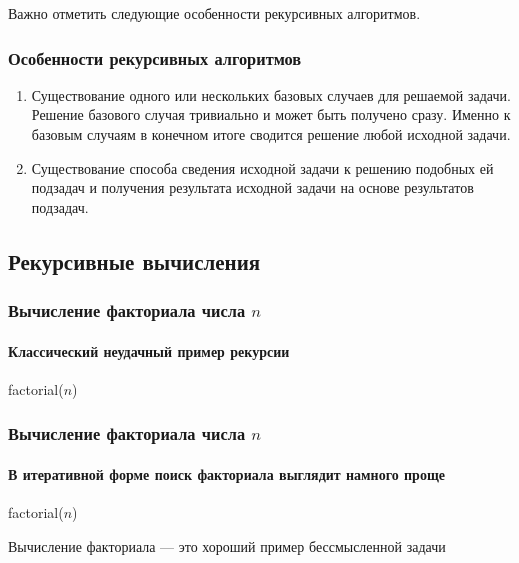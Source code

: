 Важно отметить следующие особенности рекурсивных алгоритмов.
\begin{frame}
    \frametitle{Особенности рекурсивных алгоритмов}
    \begin{enumerate}
        \item Существование одного или нескольких \alert{базовых} случаев для решаемой задачи. Решение базового случая тривиально и может быть получено сразу. Именно к базовым случаям в конечном итоге сводится решение любой исходной задачи.
        
        \item Существование \alert{способа сведения} исходной задачи к решению подобных ей подзадач и получения результата исходной задачи на основе результатов подзадач.
    \end{enumerate}
\end{frame}


\subsection{Рекурсивные вычисления}

\begin{frame}
    \frametitle{Вычисление факториала числа $n$}
    \framesubtitle{Классический неудачный пример рекурсии}
    
    \begin{algorithm}[H]
        \caption{factorial($n$)}
        \begin{algorithmic}[1]
            
            \ELSE
            \ENDIF
        \end{algorithmic}
    \end{algorithm}
\end{frame}

\begin{frame}
    \frametitle{Вычисление факториала числа $n$}
    \framesubtitle{В итеративной форме поиск факториала выглядит намного проще}
    
    \begin{algorithm}[H]
        \caption{factorial($n$)}
        \begin{algorithmic}[1]
            \ENDWHILE
        \end{algorithmic}
    \end{algorithm}
    Вычисление факториала --- это хороший пример бессмысленной задачи
\end{frame}

